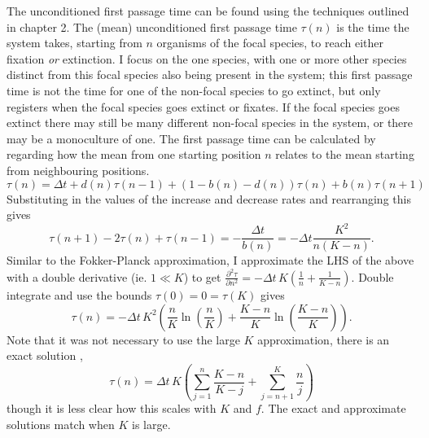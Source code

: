 The unconditioned first passage time can be found using the techniques outlined in chapter 2. 
The (mean) unconditioned first passage time $\tau(n)$ is the time the system takes, starting from $n$ organisms of the focal species, to reach either fixation \emph{or} extinction. 
I focus on the one species, with one or more other species distinct from this focal species also being present in the system; this first passage time is not the time for one of the non-focal species to go extinct, but only registers when the focal species goes extinct or fixates. 
If the focal species goes extinct there may still be many different non-focal species in the system, or there may be a monoculture of one. 
The first passage time can be calculated by regarding how the mean from one starting position $n$ relates to the mean starting from neighbouring positions.
\begin{equation}
\tau(n) = \Delta t + d(n)\tau(n-1) + \left(1-b(n)-d(n)\right)\tau(n) + b(n)\tau(n+1)
\end{equation}
Substituting in the values of the increase and decrease rates and rearranging this gives
\begin{equation*}
\tau(n+1) - 2\tau(n) + \tau(n-1) = -\frac{\Delta t}{b(n)} = -\Delta t\frac{K^2}{n(K-n)}. %
\end{equation*}
Similar to the Fokker-Planck approximation, I approximate the LHS of the above with a double derivative (ie. $1\ll K$) to get $\frac{\partial^2\tau}{\partial n^2} = -\Delta t\,K\left(\frac{1}{n}+\frac{1}{K-n}\right)$. 
Double integrate and use the bounds $\tau(0) = 0 = \tau(K)$ gives
\begin{equation}
\tau(n) = -\Delta t\,K^2\left(\frac{n}{K}\ln\left(\frac{n}{K}\right)+\frac{K-n}{K}\ln\left(\frac{K-n}{K}\right)\right).
\end{equation}
Note that it was not necessary to use the large $K$ approximation, there is an exact solution \cite{Moran1962},
\begin{equation}
\tau(n) = \Delta t\,K\left(\sum_{j=1}^n\frac{K-n}{K-j} + \sum_{j=n+1}^K\frac{n}{j}\right)
\end{equation}
though it is less clear how this scales with $K$ and $f$. 
The exact and approximate solutions match when $K$ is large. 



